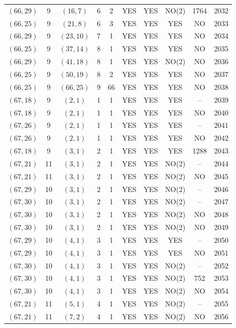 \begin{longtable}{|c|c|c|c|c|c|c|c|c|c|}
$(66, 29)$ & 9 & $(16, 7)$ & 6 & 2 & YES & YES & NO(2) & 1764 & 2032\\
$(66, 25)$ & 9 & $(21, 8)$ & 6 & 3 & YES & YES & YES & NO & 2033\\
$(66, 29)$ & 9 & $(23, 10)$ & 7 & 1 & YES & YES & YES & NO & 2034\\
$(66, 25)$ & 9 & $(37, 14)$ & 8 & 1 & YES & YES & YES & NO & 2035\\
$(66, 29)$ & 9 & $(41, 18)$ & 8 & 1 & YES & YES & NO(2) & NO & 2036\\
$(66, 25)$ & 9 & $(50, 19)$ & 8 & 2 & YES & YES & YES & NO & 2037\\
$(66, 25)$ & 9 & $(66, 25)$ & 9 & 66 & YES & YES & YES & NO & 2038\\
$(67, 18)$ & 9 & $(2, 1)$ & 1 & 1 & YES & YES & YES & -- & 2039\\
$(67, 18)$ & 9 & $(2, 1)$ & 1 & 1 & YES & YES & YES & NO & 2040\\
$(67, 26)$ & 9 & $(2, 1)$ & 1 & 1 & YES & YES & YES & -- & 2041\\
$(67, 26)$ & 9 & $(2, 1)$ & 1 & 1 & YES & YES & YES & NO & 2042\\
$(67, 18)$ & 9 & $(3, 1)$ & 2 & 1 & YES & YES & YES & 1288 & 2043\\
$(67, 21)$ & 11 & $(3, 1)$ & 2 & 1 & YES & YES & NO(2) & -- & 2044\\
$(67, 21)$ & 11 & $(3, 1)$ & 2 & 1 & YES & YES & NO(2) & NO & 2045\\
$(67, 29)$ & 10 & $(3, 1)$ & 2 & 1 & YES & YES & NO(2) & -- & 2046\\
$(67, 30)$ & 10 & $(3, 1)$ & 2 & 1 & YES & YES & NO(2) & -- & 2047\\
$(67, 30)$ & 10 & $(3, 1)$ & 2 & 1 & YES & YES & NO(2) & NO & 2048\\
$(67, 30)$ & 10 & $(3, 1)$ & 2 & 1 & YES & YES & NO(2) & NO & 2049\\
$(67, 29)$ & 10 & $(4, 1)$ & 3 & 1 & YES & YES & YES & -- & 2050\\
$(67, 29)$ & 10 & $(4, 1)$ & 3 & 1 & YES & YES & YES & NO & 2051\\
$(67, 30)$ & 10 & $(4, 1)$ & 3 & 1 & YES & YES & NO(2) & -- & 2052\\
$(67, 30)$ & 10 & $(4, 1)$ & 3 & 1 & YES & YES & NO(2) & 752 & 2053\\
$(67, 30)$ & 10 & $(4, 1)$ & 3 & 1 & YES & YES & NO(2) & NO & 2054\\
$(67, 21)$ & 11 & $(5, 1)$ & 4 & 1 & YES & YES & NO(2) & -- & 2055\\
$(67, 21)$ & 11 & $(7, 2)$ & 4 & 1 & YES & YES & NO(2) & NO & 2056\\

\end{longtable}
